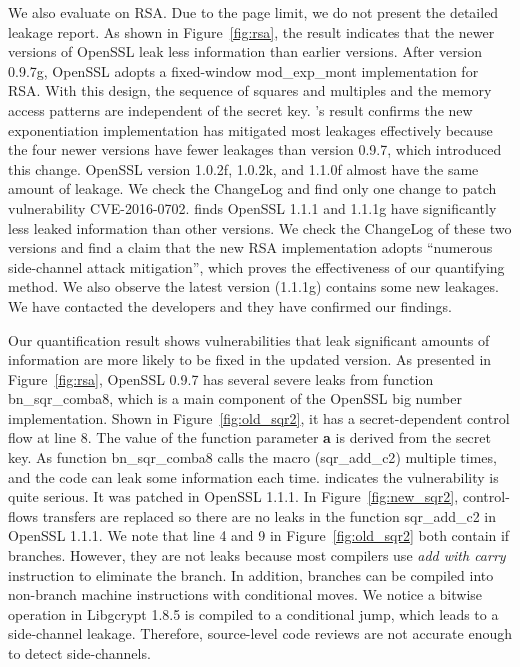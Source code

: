 We also evaluate \tool{} on RSA. Due to the page limit,
we do not present the detailed leakage report. %
 As shown in Figure~\ref{fig:rsa}, the result indicates that the newer
versions of OpenSSL leak less information than earlier
versions. After version 0.9.7g, OpenSSL adopts a fixed-window \textsf{mod\_exp\_mont}
implementation for RSA\@. With this design, the sequence of squares and
multiples and the memory access patterns are independent of the secret key.
\tool{}'s result confirms the new exponentiation implementation has mitigated 
most leakages effectively because the four newer versions have fewer
leakages than version 0.9.7, which introduced this change.
OpenSSL version 1.0.2f, 1.0.2k, and 1.1.0f almost have the
same amount of leakage. We check the ChangeLog and find only one change to
patch vulnerability CVE-2016-0702. 
\tool{} finds OpenSSL 1.1.1 and 1.1.1g have significantly less
leaked information than other versions.
We check the ChangeLog of these two versions and find a claim that
the new RSA implementation adopts ``numerous side-channel attack mitigation'', 
which proves the effectiveness of our quantifying method.
We also observe the latest version (1.1.1g) contains some new leakages. We have
contacted the developers and they have confirmed our findings.



Our quantification result shows vulnerabilities
that leak significant amounts of information
are more likely to be fixed in the updated version.
As presented in Figure~\ref{fig:rsa}, 
OpenSSL 0.9.7 has several severe leaks from
function \textsf{bn\_sqr\_comba8}, which is a main 
component of the OpenSSL big number implementation.
Shown in Figure~\ref{fig:old_sqr2}, it has a 
secret-dependent control flow at line 8.
The value of the function parameter \textbf{a} is derived from
the secret key. 
As function \textsf{bn\_sqr\_comba8}
calls the macro (\textsf{sqr\_add\_c2}) multiple times, 
and the code can leak some information each time.
\tool{} indicates the vulnerability is quite serious. 
It was patched in OpenSSL 1.1.1\@. In 
Figure~\ref{fig:new_sqr2}, control-flows transfers are replaced
so there are no leaks in the function
\textsf{sqr\_add\_c2} in OpenSSL 1.1.1\@. We note
that line 4 and 9 in Figure~\ref{fig:old_sqr2} both contain if branches.
However, they are not leaks because
most compilers use \emph{add with carry} instruction to eliminate the branch.
In addition, branches can be compiled into non-branch machine instructions 
with conditional moves. 
We notice a bitwise operation in Libgcrypt 1.8.5 is compiled to a conditional 
jump, which leads to a side-channel leakage.
Therefore, source-level code reviews are not accurate
enough to detect side-channels. 

